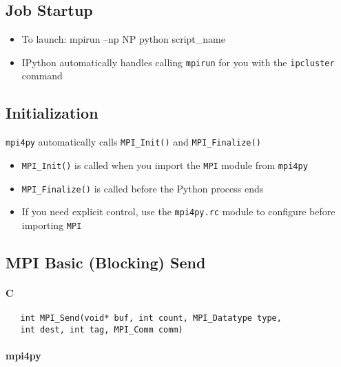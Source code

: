 \documentclass{article}
\begin{document}
    \subsection{Job Startup}\label{job-startup}

\begin{itemize}
\itemsep1pt\parskip0pt
\item
  To launch: mpirun --np NP python script\_name
\item
  IPython automatically handles calling \texttt{mpirun} for you with the
  \texttt{ipcluster} command
\end{itemize}

\subsection{Initialization}\label{initialization}

\texttt{mpi4py} automatically calls \texttt{MPI\_Init()} and
\texttt{MPI\_Finalize()}

\begin{itemize}
\itemsep1pt\parskip0pt
\item
  \texttt{MPI\_Init()} is called when you import the \texttt{MPI} module
  from \texttt{mpi4py}
\item
  \texttt{MPI\_Finalize()} is called before the Python process ends
\item
  If you need explicit control, use the \texttt{mpi4py.rc} module to
  configure before importing \texttt{MPI}
\end{itemize}

    \subsection{MPI Basic (Blocking) Send}\label{mpi-basic-blocking-send}

\paragraph{C}\label{c}

\begin{verbatim}
   int MPI_Send(void* buf, int count, MPI_Datatype type, 
   int dest, int tag, MPI_Comm comm)
\end{verbatim}

\paragraph{mpi4py}\label{mpi4py}
\end{document}
